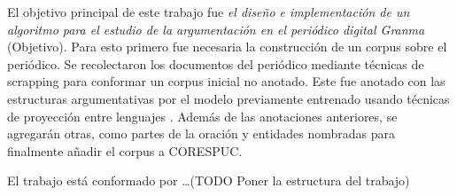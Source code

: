 El objetivo principal de este trabajo fue \emph{el diseño e implementación de un algoritmo para 
el estudio de la argumentación en el periódico digital Granma} (Objetivo). Para esto primero
fue necesaria la construcción de un corpus sobre el periódico. Se recolectaron los documentos
del periódico mediante técnicas de scrapping para conformar un corpus inicial no anotado. Este
fue anotado con las estructuras argumentativas por el modelo previamente entrenado usando técnicas 
de proyección entre lenguajes \cite{eger2018cross}. Además de las anotaciones anteriores, se agregarán 
otras, como partes de la oración y entidades nombradas para finalmente añadir el corpus a CORESPUC.


El trabajo está conformado por \dots (TODO Poner la estructura del trabajo)






